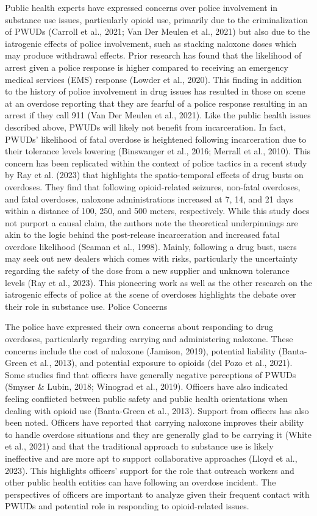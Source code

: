 Public health experts have expressed concerns over police involvement in substance use issues, particularly opioid use, primarily due to the criminalization of PWUDs (Carroll et al., 2021; Van Der Meulen et al., 2021) but also due to the iatrogenic effects of police involvement, such as stacking naloxone doses which may produce withdrawal effects. Prior research has found that the likelihood of arrest given a police response is higher compared to receiving an emergency medical services (EMS) response (Lowder et al., 2020). This finding in addition to the history of police involvement in drug issues has resulted in those on scene at an overdose reporting that they are fearful of a police response resulting in an arrest if they call 911 (Van Der Meulen et al., 2021). Like the public health issues described above, PWUDs will likely not benefit from incarceration. In fact, PWUDs’ likelihood of fatal overdose is heightened following incarceration due to their tolerance levels lowering (Binswanger et al., 2016; Merrall et al., 2010). This concern has been replicated within the context of police tactics in a recent study by Ray et al. (2023) that highlights the spatio-temporal effects of drug busts on overdoses. They find that following opioid-related seizures, non-fatal overdoses, and fatal overdoses, naloxone administrations increased at 7, 14, and 21 days within a distance of 100, 250, and 500 meters, respectively. While this study does not purport a causal claim, the authors note the theoretical underpinnings are akin to the logic behind the post-release incarceration and increased fatal overdose likelihood (Seaman et al., 1998). Mainly, following a drug bust, users may seek out new dealers which comes with risks, particularly the uncertainty regarding the safety of the dose from a new supplier and unknown tolerance levels (Ray et al., 2023). This pioneering work as well as the other research on the iatrogenic effects of police at the scene of overdoses highlights the debate over their role in substance use.
Police Concerns

The police have expressed their own concerns about responding to drug overdoses, particularly regarding carrying and administering naloxone. These concerns include the cost of naloxone (Jamison, 2019), potential liability (Banta-Green et al., 2013), and potential exposure to opioids (del Pozo et al., 2021). Some studies find that officers have generally negative perceptions of PWUDs (Smyser & Lubin, 2018; Winograd et al., 2019). Officers have also indicated feeling conflicted between public safety and public health orientations when dealing with opioid use (Banta-Green et al., 2013). Support from officers has also been noted. Officers have reported that carrying naloxone improves their ability to handle overdose situations and they are generally glad to be carrying it (White et al., 2021) and that the traditional approach to substance use is likely ineffective and are more apt to support collaborative approaches (Lloyd et al., 2023). This highlights officers’ support for the role that outreach workers and other public health entities can have following an overdose incident. The perspectives of officers are important to analyze given their frequent contact with PWUDs and potential role in responding to opioid-related issues. 

